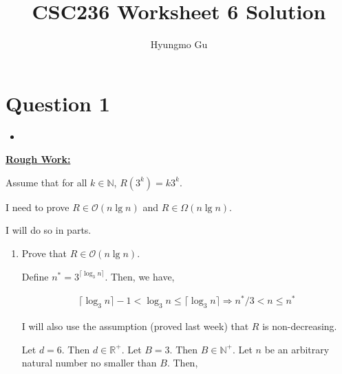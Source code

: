 \documentclass[12pt]{article}
\begin{document}
\title{CSC236 Worksheet 6 Solution}
\author{Hyungmo Gu}
\maketitle

\section*{Question 1}
\begin{itemize}
    \item

\end{itemize}

\bigskip

\begin{mdframed}
    \underline{\textbf{Rough Work:}}

    \bigskip

    Assume that for all $k \in \mathbb{N}$, $R(3^k) = k3^k$.

    \bigskip

    I need to prove $R \in \mathcal{O}(n \lg n)$ and $R \in \Omega(n \lg n)$.

    \bigskip

    I will do so in parts.

    \begin{enumerate}[1.]
        \item Prove that $R \in \mathcal{O}(n \lg n)$.

        \bigskip

        Define $n^* = 3^{\lceil \log_3 n \rceil}$. Then, we have,

        \begin{align}
            \lceil \log_3 n \rceil - 1 < \log_3 n \leq \lceil \log_3 n \rceil \Rightarrow n^*/3 < n \leq n^*
        \end{align}

        I will also use the assumption (proved last week) that $R$ is non-decreasing.

        \bigskip

        Let $d = 6$. Then $d \in \mathbb{R}^+$. Let $B = 3$. Then $B \in \mathbb{N}^+$. Let
        $n$ be an arbitrary natural number no smaller than $B$. Then,


\end{enumerate}
\end{mdframed}
\end{document}
